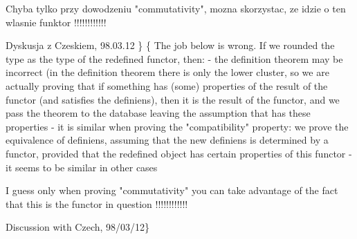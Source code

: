         Chyba tylko przy dowodzeniu "commutativity", mozna skorzystac,
        ze idzie o ten wlasnie funktor !!!!!!!!!!!!
      
        Dyskusja z Czeskiem, 98.03.12
      \}
      \{ The job below is wrong. If we rounded the type as
        the type of the redefined functor, then:
        - the definition theorem may be incorrect (in the definition
        theorem there is only the lower cluster, so we are actually
        proving that if something has (some) properties
        of the result of the functor (and satisfies the definiens),
        then it is the result of the functor,
        and we pass the theorem to the database leaving the
        assumption that has these properties
        - it is similar when proving the "compatibility" property:
        we prove the equivalence of definiens, assuming that
        the new definiens is determined by a functor, provided that
        the redefined object has certain properties of this functor
         - it seems to be similar in other cases
      
        I guess only when proving "commutativity" you can take advantage of the fact
        that this is the functor in question !!!!!!!!!!!!
      
         Discussion with Czech, 98/03/12\}
      
